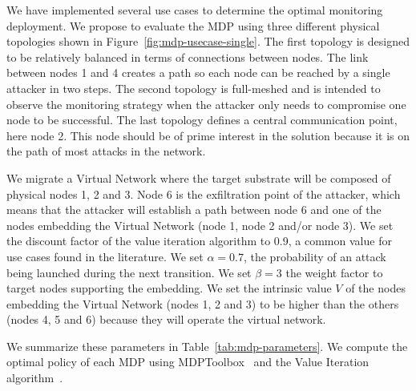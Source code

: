 We have implemented several use cases to determine the optimal monitoring deployment.
We propose to evaluate the MDP using three different physical topologies shown in Figure~\ref{fig:mdp-usecase-single}. The first topology is designed to be relatively balanced in terms of connections between nodes. The link between nodes 1 and 4 creates a path so each node can be reached by a single attacker in two steps.
The second topology is full-meshed and is intended to observe the monitoring strategy when the attacker only needs to compromise one node to be successful.
The last topology defines a central communication point, here node 2. This node should be of prime interest in the solution because it is on the path of most attacks in the network.


 
We migrate a Virtual Network where the target substrate will be composed of physical nodes 1, 2 and 3.
Node 6 is the exfiltration point of the attacker, which means that the attacker will establish a path between node 6 and one of the nodes embedding the Virtual Network (\ie node 1, node 2 and/or node 3).
We set the discount factor of the value iteration algorithm to 0.9, a common value for use cases found in the literature.
We set $\alpha=0.7$, the probability of an attack being launched during the next transition.
We set $\beta=3$ the weight factor to target nodes supporting the embedding.
We set the intrinsic value $V$ of the nodes embedding the Virtual Network (nodes 1, 2 and 3) to be higher than the others (nodes 4, 5 and 6) because they will operate the virtual network.

We summarize these parameters in Table~\ref{tab:mdp-parameters}. 
We compute the optimal policy of each MDP using MDPToolbox~\cite{Chades2014} and the Value Iteration algorithm~\cite{bellman1957}.

